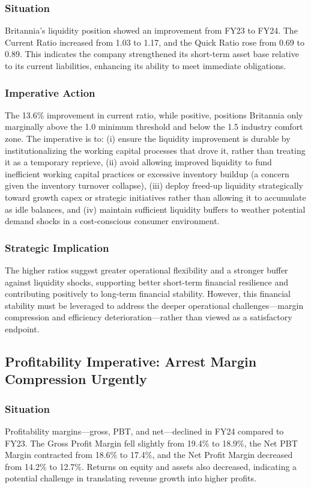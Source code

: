 \documentclass[12pt, a4paper]{report}
\begin{document}
\subsubsection{Situation}
Britannia's liquidity position showed an improvement from FY23 to FY24. The Current Ratio increased from 1.03 to 1.17, and the Quick Ratio rose from 0.69 to 0.89. This indicates the company strengthened its short-term asset base relative to its current liabilities, enhancing its ability to meet immediate obligations.

\subsubsection{Imperative Action}
The 13.6\% improvement in current ratio, while positive, positions Britannia only marginally above the 1.0 minimum threshold and below the 1.5 industry comfort zone. The imperative is to: (i) ensure the liquidity improvement is durable by institutionalizing the working capital processes that drove it, rather than treating it as a temporary reprieve, (ii) avoid allowing improved liquidity to fund inefficient working capital practices or excessive inventory buildup (a concern given the inventory turnover collapse), (iii) deploy freed-up liquidity strategically toward growth capex or strategic initiatives rather than allowing it to accumulate as idle balances, and (iv) maintain sufficient liquidity buffers to weather potential demand shocks in a cost-conscious consumer environment.

\subsubsection{Strategic Implication}
The higher ratios suggest greater operational flexibility and a stronger buffer against liquidity shocks, supporting better short-term financial resilience and contributing positively to long-term financial stability. However, this financial stability must be leveraged to address the deeper operational challenges—margin compression and efficiency deterioration—rather than viewed as a satisfactory endpoint.

\subsection{Profitability Imperative: Arrest Margin Compression Urgently}

\subsubsection{Situation}
Profitability margins—gross, PBT, and net—declined in FY24 compared to FY23. The Gross Profit Margin fell slightly from 19.4\% to 18.9\%, the Net PBT Margin contracted from 18.6\% to 17.4\%, and the Net Profit Margin decreased from 14.2\% to 12.7\%. Returns on equity and assets also decreased, indicating a potential challenge in translating revenue growth into higher profits.
\end{document}
